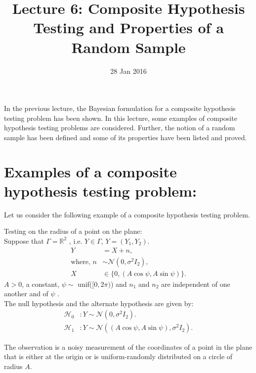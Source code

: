 \documentclass[a4paper,english,12pt]{article}
\title{Lecture 6: Composite Hypothesis Testing and Properties of a Random Sample}
\date{28 Jan 2016}
\author{}
\begin{document}
\maketitle
In the previous lecture, the Bayesian formulation for a composite hypothesis testing problem has been shown. In this lecture, some examples of composite hypothesis testing problems are considered. Further, the notion of a random sample has been defined and some of its properties have been listed and proved.

\section{Examples of a composite hypothesis testing problem:}
Let us consider the following example of a composite hypothesis testing problem.

\begin{exmp}
Testing on the radius of a point on the plane:\\
Suppose that $\Gamma = {\mathbb{R}}^2$ , i.e. $Y \in \Gamma$, $Y = (Y_1,Y_2).$
\begin{align*}
Y &= X + n,\\
\mbox{where, }
n &\sim \mathcal{N}(0,\sigma^2I_2),\nonumber\\
X &\in \{0,(A\cos\psi,A\sin\psi)\}.\nonumber
\end{align*}
$A > 0$, a constant, $\psi \sim$ unif($[0,2\pi)$) and $n_1$ and $n_2$ are independent of one another and of $\psi$ .\\
	
The null hypothesis and the alternate hypothesis are given by:
\begin{align*}
\mathcal{H}_0 &: Y \sim \mathcal{N}(0,\sigma^2I_2).\\
\mathcal{H}_1 &: Y \sim \mathcal{N}((A\cos\psi,A\sin\psi),\sigma^2I_2).
\end{align*}
	
The observation is a noisy measurement of the coordinates of a point in the plane that is either at the origin or is uniform-randomly distributed on a circle of radius $A$.
	

\end{exmp}
\end{document}
